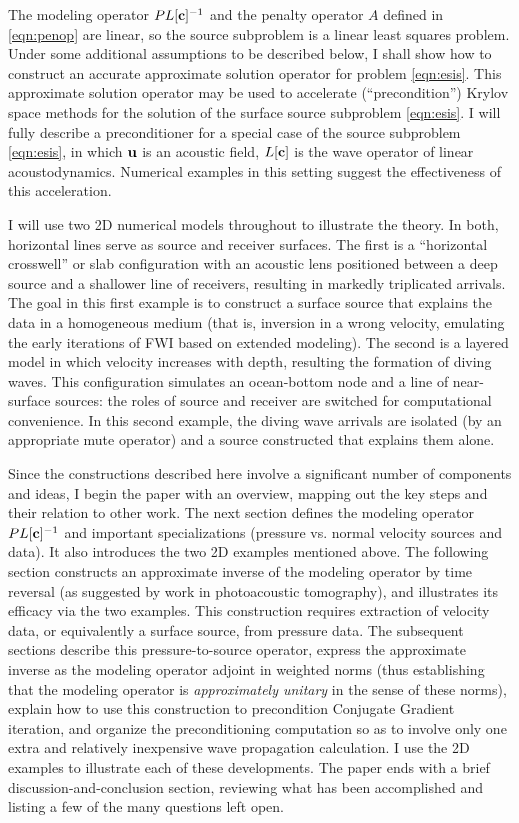 \documentclass[12pt]{geophysics}
\begin{document}
The modeling operator $PL[{\bf c}]^{-1}$ and the penalty operator $A$ defined in \ref{eqn:penop} are linear, so the source
subproblem is a linear least squares problem. Under some additional
assumptions to be described below, I shall show how to construct an
accurate approximate solution operator for problem
\ref{eqn:esis}. This approximate solution operator may be used to
accelerate (``precondition'') Krylov space methods for the solution of the surface source
subproblem \ref{eqn:esis}. I will fully describe a preconditioner for a special
case of the source subproblem \ref{eqn:esis}, in which ${\bf u}$ is an
acoustic field, $L[{\bf c}]$ is the wave operator of linear
acoustodynamics. Numerical examples in this setting suggest the
effectiveness of this acceleration.

I will use two 2D numerical models 
throughout to illustrate the theory. In both, horizontal lines serve as
source and receiver surfaces. The first is a ``horizontal crosswell'' or slab
configuration with an acoustic lens positioned between a deep source
and a shallower line of 
receivers, resulting in markedly triplicated arrivals. The goal in
this first example is to construct a surface source that explains the data in a
homogeneous medium (that is, inversion in a wrong velocity, emulating
the early iterations of FWI based on extended modeling). The second is a layered
model in which velocity increases with depth, resulting the formation
of diving waves. This configuration simulates an
ocean-bottom node and a line of near-surface sources: the roles of
source and receiver are switched for computational convenience. In
this second example, the diving wave arrivals are isolated (by an
appropriate mute operator) and a
source constructed that explains them alone.

Since the constructions described here involve a significant number of
components and ideas, I begin the paper with an overview, mapping out
the key steps and their relation to other work.
The next section defines the modeling operator $PL[{\bf c}]^{-1}$ and important specializations (pressure vs. normal velocity
sources and data). It also introduces the two 2D examples mentioned
above.  The following section constructs an approximate inverse of the
modeling operator by time reversal (as suggested by work in
photoacoustic tomography), and illustrates its efficacy via the two
examples. This construction requires extraction of
velocity data, or equivalently a surface source, from pressure data.
The subsequent sections describe this pressure-to-source operator,
express the approximate inverse as the modeling operator adjoint in
weighted norms (thus establishing that the modeling operator is {\em
  approximately unitary} in the sense of these norms), explain how to
use this construction to precondition Conjugate Gradient iteration,
and organize the preconditioning computation so as to involve only one
extra and relatively inexpensive wave propagation calculation. I use
the 2D examples to illustrate each of
these developments. The paper ends with a brief
discussion-and-conclusion section, reviewing what has been
accomplished and listing a few of the many questions left open.
\end{document}
